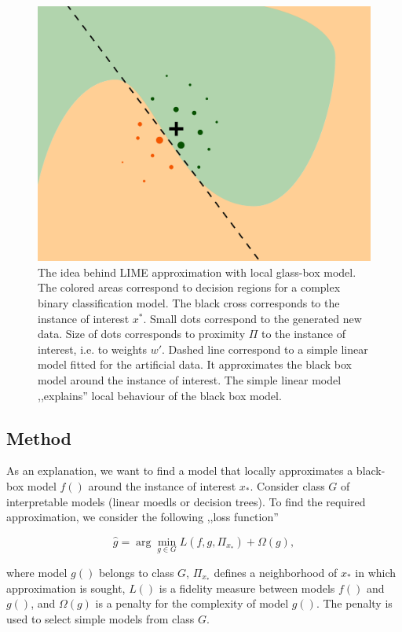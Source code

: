 \documentclass[12pt,]{krantz}
\begin{document}
\begin{figure}

{\centering \includegraphics[width=0.7\linewidth]{figure/lime_introduction} 

}

\caption{The idea behind LIME approximation with local glass-box model. The colored areas correspond to decision regions for a complex binary classification model. The black cross corresponds to the instance of interest $x^*$. Small dots correspond to the generated new data. Size of dots corresponds to proximity $\Pi$ to the instance of interest, i.e. to weights $w'$. Dashed line correspond to a simple linear model fitted for the artificial data. It approximates the black box model around the instance of interest. The simple linear model ,,explains'' local behaviour of the black box model.}\label{fig:limeIntroduction}
\end{figure}

\hypertarget{LIMEMethod}{%
\subsection{Method}\label{LIMEMethod}}

As an explanation, we want to find a model that locally approximates a black-box model \(f()\) around the instance of interest \(x_*\). Consider class \(G\) of interpretable models (linear moedls or decision trees). To find the required approximation, we consider the following ,,loss function''

\[
\hat g = \arg \min_{g \in G} L(f, g, \Pi_{x_*}) + \Omega (g), 
\]

where model \(g()\) belongs to class \(G\), \(\Pi_{x_*}\) defines a neighborhood of \(x_*\) in which approximation is sought, \(L()\) is a fidelity measure between models \(f()\) and \(g()\), and \(\Omega(g)\) is a penalty for the complexity of model \(g()\). The penalty is used to select simple models from class \(G\).
\end{document}
